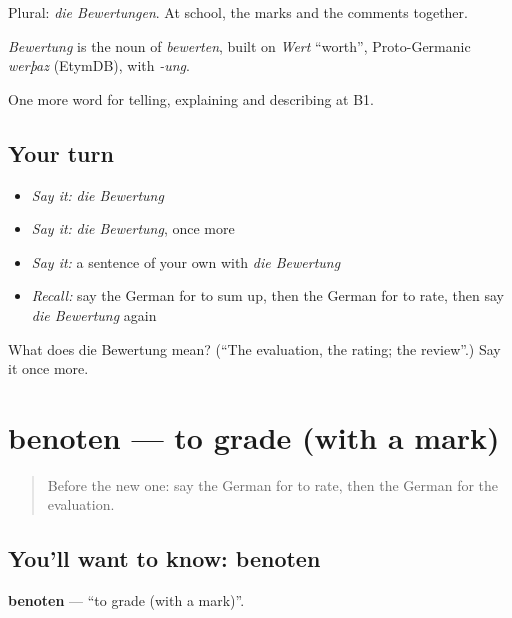 Plural: \emph{die Bewertungen}. At school, the marks and the comments together.

\begin{cousinweb}
\emph{Bewertung} is the noun of \emph{bewerten}, built on \emph{Wert} \textquotedblleft{}worth\textquotedblright{}, Proto-Germanic \emph{werþaz} (EtymDB), with \emph{-ung}.
\end{cousinweb}

\begin{grammarlens}[title={What you've built}]
One more word for telling, explaining and describing at B1.
\end{grammarlens}

\subsection*{Your turn}
\begin{itemize}
\raggedright
  \item \emph{Say it:} \emph{die Bewertung}
  \item \emph{Say it:} \emph{die Bewertung}, once more
  \item \emph{Say it:} a sentence of your own with \emph{die Bewertung}
  \item \emph{Recall:} say the German for to sum up, then the German for to rate, then say \emph{die Bewertung} again
\end{itemize}

\begin{tcolorbox}[breakable,colback=teal!4,colframe=teal!35!black,title={Before you move on}]
What does die Bewertung mean? (\textquotedblleft{}The evaluation, the rating; the review\textquotedblright{}.) Say it once more.
\end{tcolorbox}
\section[benoten]{benoten — to grade (with a mark)}

\label{lesson:GE-C379-benoten}



\begin{quote}
Before the new one: say the German for to rate, then the German for the evaluation.
\end{quote}

\subsection*{You'll want to know: benoten}
\textbf{benoten} — \textquotedblleft{}to grade (with a mark)\textquotedblright{}.

